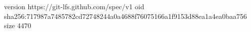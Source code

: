 version https://git-lfs.github.com/spec/v1
oid sha256:717987a7485782cd72748244a0a4688f76075166a1f9153d88ea1a4ea0baa756
size 4470
